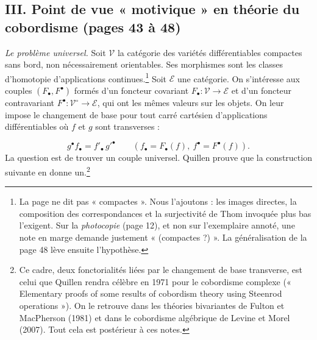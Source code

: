 \documentclass[11pt,a4paper]{article}
\begin{document}
\subsection*{III. Point de vue « motivique » en théorie du cobordisme (pages 43 à 48)}

\emph{Le problème universel.} Soit $\mathcal{V}$ la catégorie des variétés
différentiables compactes sans bord, non nécessairement orientables. Ses
morphismes sont les classes d'homotopie d'applications continues.\footnote{La
page ne dit pas « compactes ». Nous l'ajoutons : les images directes, la
composition des correspondances et la surjectivité de Thom invoquée plus bas
l'exigent. Sur la \emph{photocopie} (page 12), et non sur l'exemplaire annoté,
une note en marge demande justement « (compactes ?) ». La généralisation de la
page 48 lève ensuite l'hypothèse.} Soit $\mathcal{E}$ une catégorie. On
s'intéresse aux couples $(F_\bullet, F^\bullet)$ formés d'un foncteur covariant
$F_\bullet : \mathcal{V} \to \mathcal{E}$ et d'un foncteur contravariant
$F^\bullet : \mathcal{V}^{\circ} \to \mathcal{E}$, qui ont les mêmes valeurs sur
les objets. On leur impose le changement de base pour tout carré cartésien
d'applications différentiables où $f$ et $g$ sont transverses :


\[
g^{\bullet} f_{\bullet} = f'_{\bullet}\, g'^{\bullet}
\qquad (f_\bullet = F_\bullet(f),\ f^\bullet = F^\bullet(f)).
\]
La question est de trouver un couple universel. Quillen prouve que la
construction suivante en donne un.\footnote{Ce cadre, deux fonctorialités liées
par le changement de base transverse, est celui que Quillen rendra célèbre en
1971 pour le cobordisme complexe (« Elementary proofs of some results of
cobordism theory using Steenrod operations »). On le retrouve dans les
théories bivariantes de Fulton et MacPherson (1981) et dans le cobordisme
algébrique de Levine et Morel (2007). Tout cela est postérieur à ces notes.}
\end{document}
